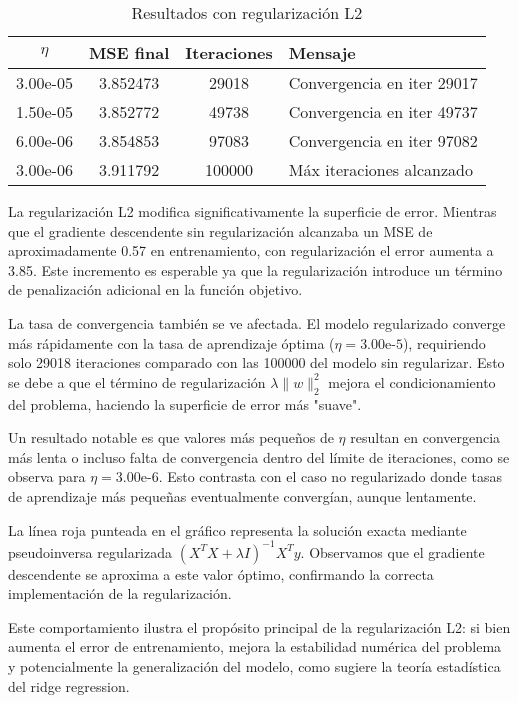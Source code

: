 \documentclass{tp02}
\begin{document}
\begin{table}[h]
\centering
\begin{tabular}{|c|c|c|l|}
\hline
$\eta$ & MSE final & Iteraciones & Mensaje \\
\hline
3.00e-05 & 3.852473 & 29018 & Convergencia en iter 29017 \\
1.50e-05 & 3.852772 & 49738 & Convergencia en iter 49737 \\
6.00e-06 & 3.854853 & 97083 & Convergencia en iter 97082 \\
3.00e-06 & 3.911792 & 100000 & Máx iteraciones alcanzado \\
\hline
\end{tabular}
\caption{Resultados con regularización L2}
\label{tab:ridge_results}
\end{table}

La regularización L2 modifica significativamente la superficie de error. 
Mientras que el gradiente descendente sin regularización alcanzaba un 
MSE de aproximadamente 0.57 en entrenamiento, con regularización el error 
aumenta a 3.85. Este incremento es esperable ya que la regularización 
introduce un término de penalización adicional en la función objetivo.

La tasa de convergencia también se ve afectada. El modelo regularizado 
converge más rápidamente con la tasa de aprendizaje óptima 
($\eta = 3.00\text{e-}5$), requiriendo solo 29018 iteraciones comparado 
con las 100000 del modelo sin regularizar. Esto se debe a que el término 
de regularización $\lambda\|w\|^2_2$ mejora el condicionamiento del 
problema, haciendo la superficie de error más "suave".

Un resultado notable es que valores más pequeños de $\eta$ resultan en 
convergencia más lenta o incluso falta de convergencia dentro del límite 
de iteraciones, como se observa para $\eta = 3.00\text{e-}6$. Esto 
contrasta con el caso no regularizado donde tasas de aprendizaje más 
pequeñas eventualmente convergían, aunque lentamente.

La línea roja punteada en el gráfico representa la solución exacta 
mediante pseudoinversa regularizada $(X^TX + \lambda I)^{-1}X^Ty$. 
Observamos que el gradiente descendente se aproxima a este valor óptimo, 
confirmando la correcta implementación de la regularización.

Este comportamiento ilustra el propósito principal de la regularización 
L2: si bien aumenta el error de entrenamiento, mejora la estabilidad 
numérica del problema y potencialmente la generalización del modelo, 
como sugiere la teoría estadística del ridge regression.
\end{document}
